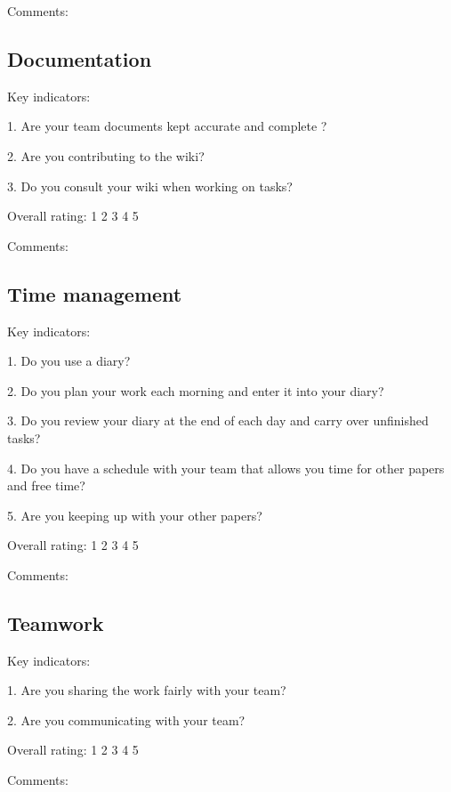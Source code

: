 \documentclass{article}   	%
\begin{document}
Comments:

\vskip 4cm



\subsection*{Documentation}

Key indicators: 

1.  Are your team documents kept accurate and complete ?

2.  Are you contributing to the wiki?

3.  Do you consult your wiki when working on tasks?

Overall rating: \hskip 1cm 1 \hskip 1cm 2 \hskip 1cm 3 \hskip 1cm 4 \hskip 1cm 5 

Comments:

\vskip 4cm

\subsection*{Time management}

Key indicators: 

1.  Do you use a diary?

2.  Do you plan your work each morning and enter it into your diary?

3.  Do you review your diary at the end of each day and carry over unfinished tasks?

4.  Do you have a schedule with your team that allows you time for other papers and free time?

5.  Are you keeping up with your other papers?

Overall rating: \hskip 1cm 1 \hskip 1cm 2 \hskip 1cm 3 \hskip 1cm 4 \hskip 1cm 5 

Comments:

\vskip 4cm

\subsection*{Teamwork}

Key indicators: 

1.  Are you sharing the work fairly with your team?

2.  Are you communicating with your team?


Overall rating: \hskip 1cm 1 \hskip 1cm 2 \hskip 1cm 3 \hskip 1cm 4 \hskip 1cm 5 

Comments:
\end{document}
